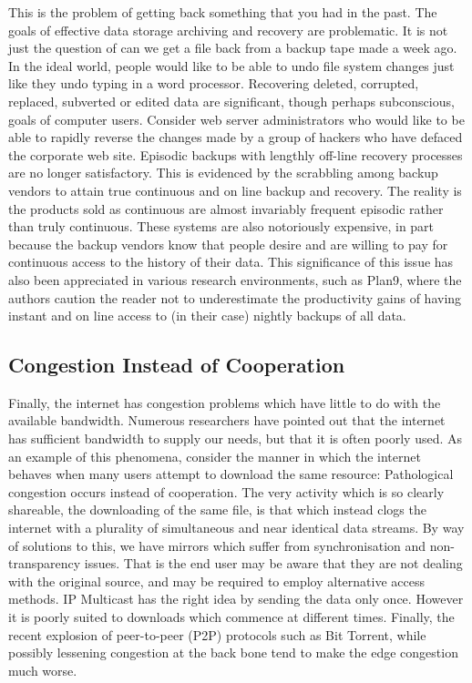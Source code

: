 \documentclass[british,english]{article}
\begin{document}
This is the problem of getting back something that you had in the
past. The goals of effective data storage archiving and recovery are
problematic. It is not just the question of can we get a file back
from a backup tape made a week ago. In the ideal world, people would
like to be able to undo file system changes just like they undo typing
in a word processor. Recovering deleted, corrupted, replaced, subverted
or edited data are significant, though perhaps subconscious, goals
of computer users. Consider web server administrators who would like
to be able to rapidly reverse the changes made by a group of hackers
who have defaced the corporate web site. Episodic backups with lengthly
off-line recovery processes are no longer satisfactory. This is evidenced
by the scrabbling among backup vendors to attain true continuous and
on line backup and recovery. The reality is the products sold as continuous
are almost invariably frequent episodic rather than truly continuous.
These systems are also notoriously expensive, in part because the
backup vendors know that people desire and are willing to pay for
continuous access to the history of their data. This significance
of this issue has also been appreciated in various research environments,
such as Plan9\citep{Pike:1990:PBLa}, where the authors caution the
reader not to underestimate the productivity gains of having instant
and on line access to (in their case) nightly backups of all data.


\subsection{Congestion Instead of Cooperation}

Finally, the internet has congestion problems which have little to
do with the available bandwidth. Numerous researchers have pointed
out that the internet has sufficient bandwidth to supply our needs,
but that it is often poorly used. As an example of this phenomena,
consider the manner in which the internet behaves when many users
attempt to download the same resource: Pathological congestion occurs
instead of cooperation. The very activity which is so clearly shareable,
the downloading of the same file, is that which instead clogs the
internet with a plurality of simultaneous and near identical data
streams. By way of solutions to this, we have mirrors which suffer
from synchronisation and non-transparency issues. That is the end
user may be aware that they are not dealing with the original source,
and may be required to employ alternative access methods. IP Multicast
has the right idea by sending the data only once. However it is poorly
suited to downloads which commence at different times. Finally, the
recent explosion of peer-to-peer (P2P) protocols such as Bit Torrent,
while possibly lessening congestion at the back bone tend to make
the edge congestion much worse. 
\end{document}

